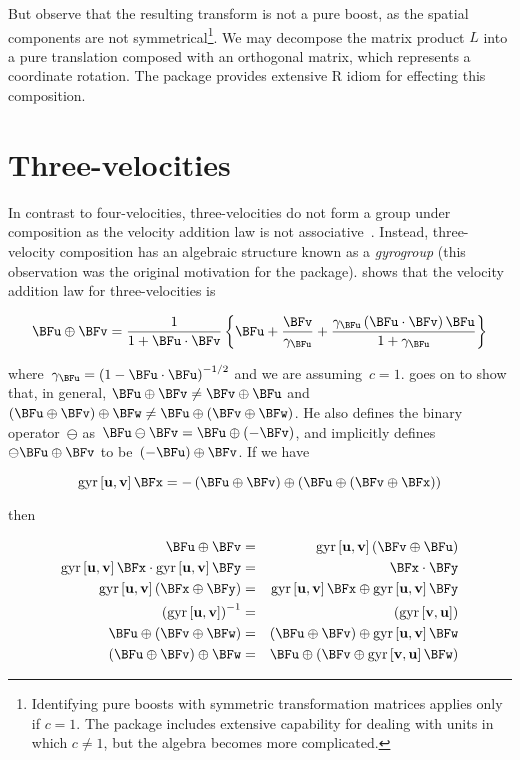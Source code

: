 \documentclass[ijoc,nonblindrev]{informs3} %
\begin{document}
But observe that the resulting transform is not a pure boost, as the
spatial components are not symmetrical\footnote{Identifying pure
  boosts with symmetric transformation matrices applies only if $c=1$.
  The package includes extensive capability for dealing with units in
  which $c\neq 1$, but the algebra becomes more complicated.}.  We may
decompose the matrix product $L$ into a pure translation composed with
an orthogonal matrix, which represents a coordinate rotation.  The
package provides extensive R idiom for effecting this composition.

\section{Three-velocities}

In contrast to four-velocities, three-velocities do not form a group
under composition as the velocity addition law is not
associative~\citep{ungar2006}.  Instead, three-velocity composition
has an algebraic structure known as a {\em gyrogroup} (this
observation was the original motivation for the package).
\citeauthor{ungar2006} shows that the velocity addition law for
three-velocities is

\begin{equation}
\BFu\oplus\BFv= \frac{1}{1+\BFu\cdot\BFv} \left\{ \BFu +
\frac{\BFv}{\gamma_\BFu} + \frac{\gamma_\BFu
  \left(\BFu\cdot\BFv\right)\BFu}{1+\gamma_\BFu} \right\}
\end{equation}
   
where~$\gamma_\BFu=\left(1-\BFu\cdot\BFu\right)^{-1/2}$ and we are
assuming~$c=1$.  \citeauthor{ungar2006} goes on to show that, in
general, $\BFu\oplus\BFv\neq\BFv\oplus\BFu$
and~$(\BFu\oplus\BFv)\oplus\BFw\neq\BFu\oplus(\BFv\oplus\BFw)$.  He also
defines the binary operator~$\ominus$
as~$\BFu\ominus\BFv=\BFu\oplus\left(-\BFv\right)$, and implicitly
defines~$\ominus\BFu\oplus\BFv$ to be~$\left(-\BFu\right)\oplus\BFv$.  If
we have

\begin{equation}
\gyr{u}{v}\BFx=-\left(\BFu\oplus\BFv\right)\oplus\left(\BFu\oplus\left(\BFv\oplus\BFx\right)\right)
\end{equation}

then

\begin{eqnarray}
\BFu\oplus\BFv &=&
\gyr{u}{v}\left(\BFv\oplus\BFu\right)\label{noncom}\\ \gyr{u}{v}\BFx\cdot\gyr{u}{v}\BFy
&=& \BFx\cdot\BFy\label{doteq}\\ \gyr{u}{v}\left(\BFx\oplus\BFy\right) &=&
\gyr{u}{v}\BFx\oplus\gyr{u}{v}\BFy\\ \left(\gyr{u}{v}\right)^{-1} &=&
\left(\gyr{v}{u}\right)\label{gyrinv}\\ \BFu\oplus\left(\BFv\oplus\BFw\right)
&=&\left(\BFu\oplus\BFv\right)\oplus\gyr{u}{v}\BFw\label{nonass1}\\ \left(\BFu\oplus\BFv\right)\oplus\BFw
&=&\BFu\oplus\left(\BFv\oplus\gyr{v}{u}\BFw\right)\label{nonass2}
\end{eqnarray}
\end{document}
